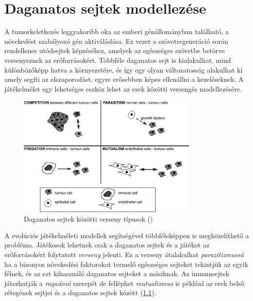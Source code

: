 \chapter{Daganatos sejtek modellezése}
A tumorkeletkezés leggyakoribb oka az emberi génállományban található, a növekedést szabályozó gén aktiválódása. Ez vezet a szövetregeneráció során rendellenes utódsejtek képzéséhez, amelyek az egészséges szövetbe betörve versenyeznek az erőforrásokért. Többféle daganatos sejt is kialakulhat, mind különbözőképp hatva a környezetére, és így egy olyan változatosság alakulhat ki amely segíti az elszaporodást, egyre erősebben képes ellenállni a kezeléseknek. A játékelmélet egy lehetséges eszköz lehet az ezek közötti versengés modellezésére.

\begin{figure}[h!]
	\centering
	\includegraphics[width=90mm]{images/models}
	\vspace*{2mm}
	\caption{Daganatos sejtek közötti verseny típusok (\cite{hummert2014evolutionary})}
	\label{fig:cancerModels}
\end{figure}

A evolúciós játékelméleti modellek segítségével többféleképpen is megközelíthető a probléma. Játékosok lehetnek csak a daganatos sejtek és a játékot az erőforrásokért folytatott \textit{verseny} jelenti. Ez a verseny átalakulhat \textit{parazitizmussá} ha a bizonyos növekedési faktorokat termelő egészséges sejteket tekintjük az egyik félnek, és az ezt kihasználó daganatos sejteket a másiknak. Az immunsejtek játszhatják a \textit{ragadozó} szerepét de felléphet \textit{mutualizmus} is például az erek belső rétegének sejtjei és a daganatos sejtek között (\ref{fig:cancerModels}). 

